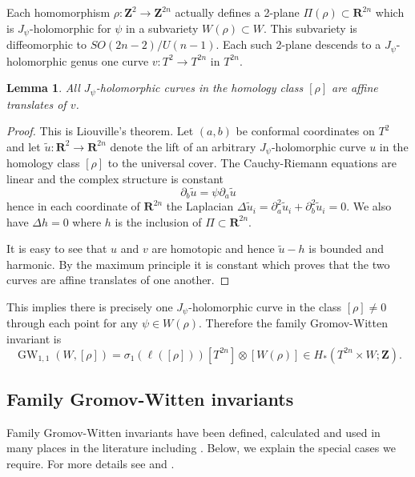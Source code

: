 \documentclass[11pt]{amsart}
\newcommand{\RR}{\mathbf{R}}
\newcommand{\ZZ}{\mathbf{Z}}
\newcommand{\GW}{\operatorname{GW}}
\newcommand{\WW}{W}
\numberwithin{equation}{section}
\newtheorem{lma}[equation]{Lemma}
\theoremstyle{definition}
\theoremstyle{remark}
\begin{document}
Each homomorphism $\rho\colon\ZZ^2\to\ZZ^{2n}$ actually defines a 2-plane $\Pi(\rho)\subset\RR^{2n}$ which is $J_{\psi}$-holomorphic for $\psi$ in a subvariety $\WW(\rho)\subset\WW$. This subvariety is diffeomorphic to $SO(2n-2)/U(n-1)$. Each such 2-plane descends to a $J_{\psi}$-holomorphic genus one curve $v\colon T^2\to T^{2n}$ in $T^{2n}$.
\begin{lma}
All $J_{\psi}$-holomorphic curves in the homology class $[\rho]$ are affine translates of $v$.
\end{lma}
\begin{proof}
This is Liouville's theorem. Let $(a,b)$ be conformal coordinates on $T^2$ and let $\tilde{u}\colon\RR^2\to\RR^{2n}$ denote the lift of an arbitrary $J_{\psi}$-holomorphic curve $u$ in the homology class $[\rho]$ to the universal cover. The Cauchy-Riemann equations are linear and the complex structure is constant
\[\partial_b\tilde{u}=\psi\partial_a\tilde{u}\]
hence in each coordinate of $\RR^{2n}$ the Laplacian $\Delta \tilde{u}_i=\partial_a^2\tilde{u}_i+\partial_b^2\tilde{u}_i=0$. We also have $\Delta h=0$ where $h$ is the inclusion of $\Pi\subset\RR^{2n}$.

It is easy to see that $u$ and $v$ are homotopic and hence $\tilde{u}-h$ is bounded and harmonic. By the maximum principle it is constant which proves that the two curves are affine translates of one another.
\end{proof}

This implies there is precisely one $J_{\psi}$-holomorphic curve in the class $[\rho]\neq 0$ through each point for any $\psi\in\WW(\rho)$. Therefore the family Gromov-Witten invariant is
\[\GW_{1,1}(\WW,[\rho])=\sigma_1(\ell([\rho]))[T^{2n}]\otimes[\WW(\rho)]\in H_*(T^{2n}\times\WW;\ZZ).\]


\subsection{Family Gromov-Witten invariants}\label{famGW}


Family Gromov-Witten invariants have been defined, calculated and used in many places in the literature including \cite{Buse,KedOno,KlemmEtAl,LeOno,Lee,Lee2,LeeLeung,LeeParker,Lu,MauPan,Sei}. Below, we explain the special cases we require. For more details see \cite{MS04} and \cite{RT2}.
\end{document}
